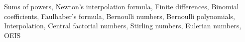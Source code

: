 Sums of powers, Newton's interpolation formula, Finite differences, Binomial coefficients, Faulhaber's formula, Bernoulli numbers, Bernoulli polynomials, Interpolation, Central factorial numbers, Stirling numbers, Eulerian numbers, OEIS
